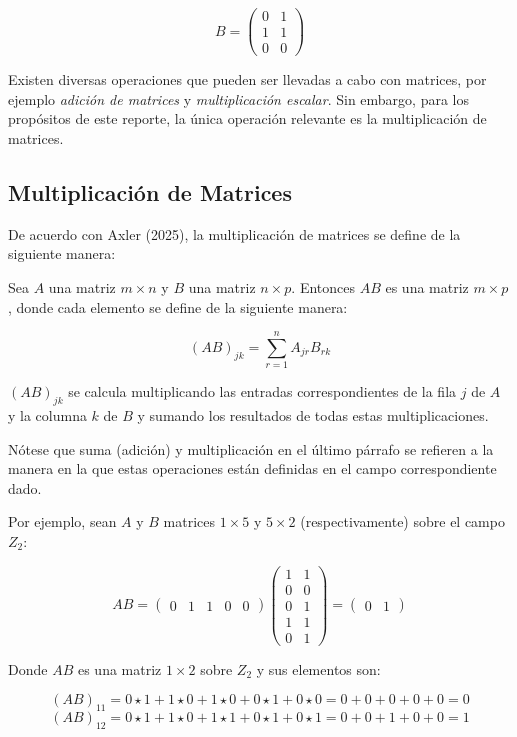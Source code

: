 \documentclass{article}
\begin{document}
$$
B = \begin{pmatrix}
    0 & 1 \\
    1 & 1 \\
    0 & 0
\end{pmatrix}
$$

Existen diversas operaciones que pueden ser llevadas a cabo con matrices, por ejemplo \textit{adición de matrices} y \textit{multiplicación escalar}. Sin embargo, para los propósitos de este reporte, la única operación relevante es la multiplicación de matrices.

\subsection{Multiplicación de Matrices}

De acuerdo con Axler (2025), la multiplicación de matrices se define de la siguiente manera:

Sea $A$ una matriz $m \times n$ y $B$ una matriz $n \times p$. Entonces $AB$ es una matriz $ m \times p $, donde cada elemento se define de la siguiente manera:

$$
(AB)_{jk} = \sum_{r=1}^n A_{jr} B_{rk}
$$

$(AB)_{jk}$ se calcula multiplicando las entradas correspondientes de la fila $j$ de $A$ y la columna $k$ de $B$ y sumando los resultados de todas estas multiplicaciones.

Nótese que suma (adición) y multiplicación en el último párrafo se refieren a la manera en la que estas operaciones están definidas en el campo correspondiente dado. 

Por ejemplo, sean $A$ y $B$ matrices $1 \times 5$ y $5 \times 2$ (respectivamente) sobre el campo $Z_2$:

$$
AB = \begin{pmatrix}
    0 & 1 & 1 & 0 & 0
\end{pmatrix}
\begin{pmatrix}
    1 & 1 \\
    0 & 0 \\
    0 & 1 \\
    1 & 1 \\
    0 & 1
\end{pmatrix}
= \begin{pmatrix}
    0 & 1
\end{pmatrix}
$$

Donde $AB$ es una matriz $1 \times 2$ sobre $Z_2$ y sus elementos son:

$$
(AB)_{11} = 0 \star 1 + 1 \star 0 + 1 \star 0 + 0 \star 1 + 0 \star 0 = 0 + 0 + 0 + 0 + 0 = 0
$$$$
(AB)_{12} = 0 \star 1 + 1 \star 0 + 1 \star 1 + 0 \star 1 + 0 \star 1 = 0 + 0 + 1 + 0 + 0 = 1
$$
\end{document}
